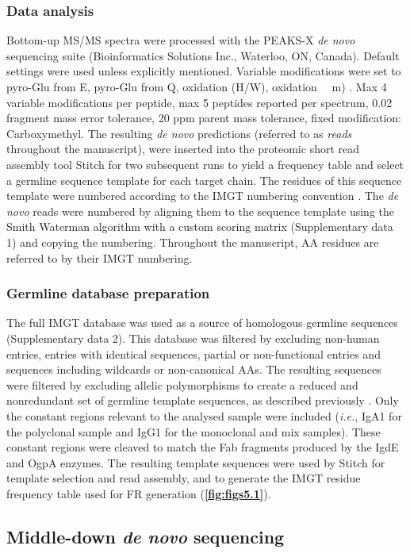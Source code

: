 \subsubsection{Data analysis}
Bottom-up MS/MS spectra were processed with the PEAKS-X \emph{de novo} sequencing suite (Bioinformatics Solutions Inc., Waterloo, ON, Canada). Default settings were used unless explicitly mentioned. Variable modifications were set to pyro-Glu from E, pyro-Glu from Q, oxidation (H/W), oxidation ~~m) . Max 4 variable modifications per peptide, max 5 peptides reported per spectrum, 0.02 fragment mass error tolerance, 20 ppm parent mass tolerance, fixed modification: Carboxymethyl. The resulting \emph{de novo} predictions (referred to as \emph{reads} throughout the manuscript), were inserted into the proteomic short read assembly tool Stitch for two subsequent runs to yield a frequency table and select a germline sequence template for each target chain. The residues of this sequence template were numbered according to the IMGT numbering convention \cite{lefranc1997unique}. The \emph{de novo} reads were numbered by aligning them to the sequence template using the Smith Waterman algorithm with a custom scoring matrix (Supplementary data 1) and copying the numbering. Throughout the manuscript, AA residues are referred to by their IMGT numbering.

\subsubsection{Germline database preparation}
The full IMGT database was used as a source of homologous germline sequences (Supplementary data 2). This database was filtered by excluding non-human entries, entries with identical sequences, partial or non-functional entries and sequences including wildcards or non-canonical AAs. The resulting sequences were filtered by excluding allelic polymorphisms to create a reduced and nonredundant set of germline template sequences, as described previously \cite{schulte2022template-based}. Only the constant regions relevant to the analysed sample were included (\emph{i.e.}, IgA1 for the polyclonal sample and IgG1 for the monoclonal and mix samples). These constant regions were cleaved to match the Fab fragments produced by the IgdE and OgpA enzymes. The resulting template sequences were used by Stitch for template selection and read assembly, and to generate the IMGT residue frequency table used for FR generation (\textbf{\autoref{fig:figs5.1}}).

\subsection{Middle-down \emph{de novo} sequencing}

